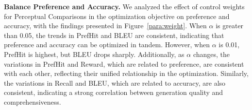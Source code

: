 \textbf{Balance Preference and Accuracy.} 
We analyzed the effect of control weights for Perceptual Comparisons in the optimization objective on preference and accuracy, with the findings presented in Figure~\ref{para:weight}.
When \( \alpha \) is greater than 0.05, the trends in PrefHit and BLEU are consistent, indicating that preference and accuracy can be optimized in tandem. However, when \( \alpha \) is 0.01, PrefHit is highest, but BLEU drops sharply.
Additionally, as \( \alpha \) changes, the variations in PrefHit and Reward, which are related to preference, are consistent with each other, reflecting their unified relationship in the optimization. Similarly, the variations in Recall and BLEU, which are related to accuracy, are also consistent, indicating a strong correlation between generation quality and comprehensiveness. 

